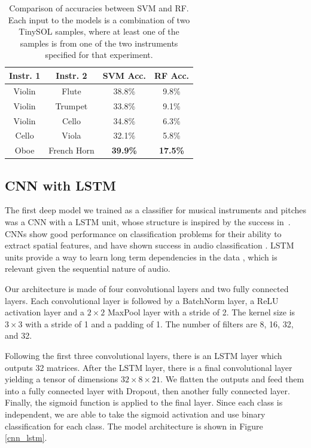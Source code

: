 \documentclass[runningheads,a4paper]{llncs}
\begin{document}
\begin{table}
  \centering
  \caption{Comparison of accuracies between SVM and RF. Each input to the models is a combination of two TinySOL samples, where at least one of the samples is from one of the two instruments specified for that experiment.}\label{tab:baselines}
    \begin{tabular}{|c|c|c|c|}
    	  \hline
      \textbf{Instr. 1} & \textbf{Instr. 2} & \textbf{SVM Acc.} & \textbf{RF Acc.}\\
      \hline
      Violin & Flute & 38.8\% & 9.8\% \\
      \hline
      Violin & Trumpet & 33.8\% & 9.1\% \\
      \hline
      Violin & Cello & 34.8\% & 6.3\% \\
      \hline
      Cello & Viola & 32.1\% & 5.8\% \\
      \hline
      Oboe & French Horn & \textbf{39.9\%} & \textbf{17.5\%} \\
      \hline
    \end{tabular}
\end{table}


\subsection{CNN with LSTM}

The first deep model we trained as a classifier for musical instruments and pitches was a CNN with a LSTM unit, whose structure is inspired by the success in~\cite{Salamon17}. CNNs show good performance on classification problems for their ability to extract spatial features, and have shown success in audio classification \cite{Hershey17}. LSTM units provide a way to learn long term dependencies in the data \cite{Hochreiter97}, which is relevant given the sequential nature of audio.

Our architecture is made of four convolutional layers and two fully connected layers. Each convolutional layer is followed by a BatchNorm layer, a ReLU activation layer and a $2 \times 2$  MaxPool layer with a stride of 2. The kernel size is $3 \times 3$ with a stride of 1 and a padding of 1. The number of filters are 8, 16, 32, and 32.

Following the first three convolutional layers, there is an LSTM layer which outputs 32 matrices. After the LSTM layer, there is a final convolutional layer yielding a tensor of dimensions $32\times 8 \times 21$. We flatten the outputs and feed them into a fully connected layer with Dropout, then another fully connected layer. Finally, the sigmoid function is applied to the final layer. Since each class is independent, we are able to take the sigmoid activation and use binary classification for each class. The model architecture is shown in Figure \ref{cnn_lstm}.
\end{document}

